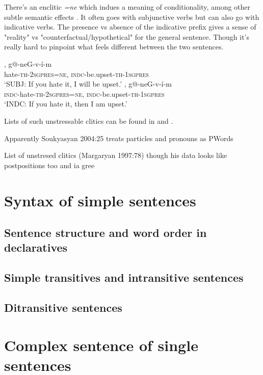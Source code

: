 There's an enclitic \textit{=ne} which indues a meaning of conditionality, among other subtle semantic effects  \cite[72ff]{Khanjian-2013-DissNegativeConcord}. It often goes with subjunctive verbs but can also go with indicative verbs. The presence vs absence of the indicative prefix gives a sense of "reality" vs "counterfactual/hypothetical" for the general sentence. Though it's really hard to pinpoint what feels different between the two sentences.

\begin{exe}
	\ex  {}, {g@-neG-v-\'i-m}\\
	hate-\textsc{th-2sgpres=ne}, \textsc{indc}-be.upset-\textsc{th-1sgpres}\\
	\trans `SUBJ: If you hate it, I will be upset.'
	\ex  {}, {g@-neG-v-\'i-m}\\
	\textsc{indc}-hate-\textsc{th-2sgpres=ne}, \textsc{indc}-be.upset-\textsc{th-1sgpres}\\
	\trans `INDC: If you hate it, then I am upset.'
	
\end{exe}

Lists of such unstressable clitics can be found in \citet[78]{Margaryan-1997-ArmenianPhonology} and \citet[72]{Khanjian-2013-DissNegativeConcord}.



Apparently Soukyasyan 2004:25 treats particles and pronouns as PWords

List of unstresed clitics (Margaryan 1997:78) though his data looks like postpositions too and ia gree



\part{Syntax of simple sentences}
\chapter{Sentence  structure and word order in declaratives}
\chapter{Simple transitives and intransitive sentences}
\chapter{Ditransitive sentences}
\part{Complex sentence of single sentences}
